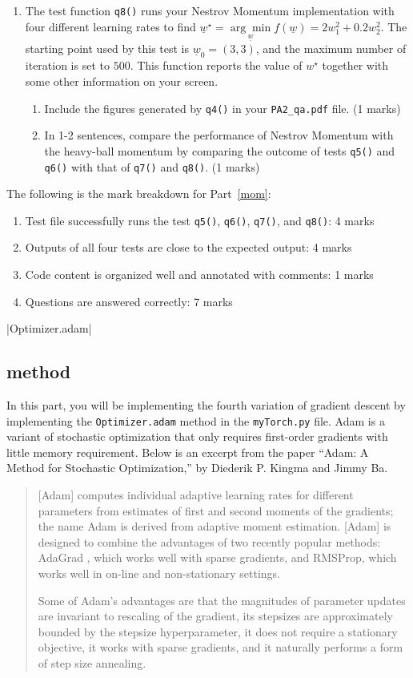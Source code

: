 \documentclass{article}
\theoremstyle{definition}
\begin{document}
\begin{enumerate}[label=\ref{mom}.\alph*)]
	\item The test function \verb|q8()| runs your Nestrov Momentum implementation with four different learning rates to find $\underline{w}^\star = \underset{\underline{w}}{\arg \min} f(\underline{w}) = 2w_1^2 + 0.2w_2^2$. The starting point used by this test is $\underline{w}_0=(3,3)$, and the maximum number of iteration is set to $500$. This function reports the value of $w^\star$ together with some other information on your screen.
	\begin{enumerate}[label=1.2.d.\roman*)]
		\item Include the figures generated by \verb|q4()| in your \verb|PA2_qa.pdf| file. (1 marks)
		\item In 1-2 sentences, compare the performance of Nestrov Momentum with the heavy-ball momentum by comparing the outcome of tests \verb|q5()| and \verb|q6()| with that of \verb|q7()| and \verb|q8()|. (1 marks)
	\end{enumerate}
\end{enumerate}
The following is the mark breakdown for Part~\ref{mom}:
\begin{enumerate}[label=(\roman*)]
	\item Test file successfully runs the test \verb|q5()|, \verb|q6()|, \verb|q7()|, and \verb|q8()|: 4 marks
	\item Outputs of all four tests are close to the expected output: 4 marks
	\item Code content is organized well and annotated with comments: 1 marks
	\item Questions are answered correctly: 7 marks
\end{enumerate}
|Optimizer.adam|
\subsection{ method}\label{adam}
In this part, you will be implementing the fourth variation of gradient descent by implementing the \verb|Optimizer.adam| method in the \verb|myTorch.py| file. Adam is a variant of stochastic optimization that only requires first-order gradients with little memory requirement. Below is an excerpt from the paper ``Adam: A Method for Stochastic Optimization,'' by Diederik P. Kingma and Jimmy Ba.
\begin{quote}
	[Adam] computes individual adaptive learning rates for
	different parameters from estimates of first and second moments of the gradients; the name Adam
	is derived from adaptive moment estimation. [Adam] is designed to combine the advantages
	of two recently popular methods: AdaGrad , which works well with sparse gradients, and RMSProp, which works well in on-line and non-stationary
	settings.
	
	Some of Adam's advantages are that the magnitudes of parameter updates are invariant to
	rescaling of the gradient, its stepsizes are approximately bounded by the stepsize hyperparameter,
	it does not require a stationary objective, it works with sparse gradients, and it naturally performs a
	form of step size annealing.
\end{quote}
\end{document}
